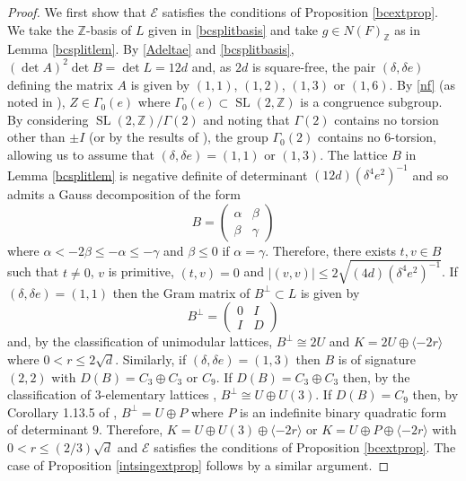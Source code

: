 \documentclass[12pt, a4paper]{article}
\newcommand{\ZZ}{\mathbb{Z}}
\newcommand{\la}{\langle}
\newcommand{\ra}{\rangle}
\newcommand{\ec}{\mathcal{E}}
\newcommand{\opn}{\operatorname}
\newcommand{\op}{\oplus}
\begin{document}
\begin{proof}
  We first show that $\ec$ satisfies the conditions of Proposition \ref{bcextprop}.
  We take the $\ZZ$-basis of $L$ given in \eqref{bcsplitbasis} and take $g \in N(F)_{\ZZ}$ as in Lemma \ref{bcsplitlem}.
  By \eqref{Adeltae} and \eqref{bcsplitbasis},  $(\opn{det} A)^2 \opn{det} B = \opn{det} L = 12 d$ and, as $2d$ is square-free, the pair $(\delta, \delta e)$ defining the matrix $A$ is given by
$(1,1)$, $(1,2)$, $(1,3)$ or $(1,6)$.
  By \eqref{nf} (as noted in \cite[Proposition 2.27]{GHSK3}), $Z \in \Gamma_0(e)$ where $\Gamma_0(e) \subset \opn{SL}(2, \ZZ)$ is a congruence subgroup.
  By considering $\opn{SL}(2, \ZZ)/\Gamma(2)$ and noting that $\Gamma(2)$ contains no torsion other than $\pm I$ (or by the results of \cite{sebbar}), the group $\Gamma_0(2)$ contains no 6-torsion, allowing us to assume that $(\delta, \delta e)=(1,1)$ or $(1,3)$.
  The lattice
$B$ in Lemma \ref{bcsplitlem} is negative definite  of determinant $(12d)(\delta^4 e^2)^{-1}$ and so admits a Gauss decomposition \cite[p.358]{SPLAG} of the form
  \[
  B
  =
  \begin{pmatrix}
    \alpha & \beta \\
    \beta & \gamma
  \end{pmatrix}
  \]
  where $ \alpha < - 2\beta \leq - \alpha \leq - \gamma$ and 
  $\beta \leq 0$ if $\alpha = \gamma$.
Therefore, there exists $t, v \in B$ such that $t \neq 0$, $v$ is primitive, $(t, v)=0$ and $\vert (v,v) \vert \leq 2 \sqrt{(4d)(\delta^4 e^2)^{-1}}$.
  If $(\delta, \delta e) = (1,1)$ then the Gram matrix of $B^{\perp} \subset L$ is given by
  \begin{equation*}
    B^{\perp} =
    \begin{pmatrix}
      0 & I \\
      I & D
    \end{pmatrix}
  \end{equation*}
  and, by the classification of unimodular lattices, $B^{\perp} \cong 2U$ and  $K = 2U \op \la -2r \ra$ where $0<r \leq 2\sqrt{d}$.
  Similarly, if $(\delta, \delta e) = (1,3)$ then $B$ is of signature $(2,2)$ with
  $D(B) = C_3 \op C_3$ or $C_9$.
  If $D(B) = C_3 \op C_3$ then, by the classification of 3-elementary lattices \cite[p.386]{SPLAG}, $B^{\perp} \cong U \op U(3)$. 
  If $D(B) = C_9$ then, by Corollary 1.13.5 of \cite{Nikulin}, $B^{\perp} = U \op P$ where $P$ is an indefinite binary quadratic form of determinant $9$.
  Therefore, $K = U \op U(3) \op \la -2r \ra$ or $K= U \op P \op \la -2r \ra$ with  $0<r \leq (2/3) \sqrt{d}$ and $\ec$ satisfies the conditions of Proposition \ref{bcextprop}.
  The case of Proposition \ref{intsingextprop} follows by a similar argument.
\end{proof}
\end{document}
